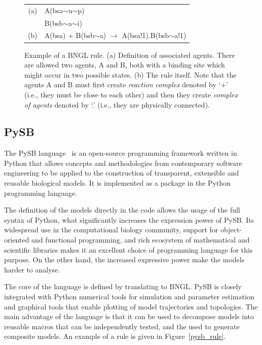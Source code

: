\documentclass[11pt,a4paper]{report}
\begin{document}
\begin{figure}[!h]
\begin{center}
\begin{tabular}{c l}
(a) & A(bsa$\sim$u$\sim$p) \\
  & B(bsb$\sim$a$\sim$i) \\
(b) & A(bsa) + B(bsb$\sim$a) $\rightarrow$ A(bsa!1).B(bsb$\sim$a!1) \\
\end{tabular}
\end{center}
\caption{Example of a BNGL rule. (a) Definition of associated agents. There are allowed two agents, A and B, both with a binding site which might occur in two possible states. (b) The rule itself. Note that the agents A and B must first create \emph{reaction complex} denoted by `+' (i.e., they must be close to each other) and then they create \emph{complex of agents} denoted by `.' (i.e., they are physically connected).}\label{bngl-rule}
\end{figure}

\subsection{PySB}

The PySB language~\cite{Lopez646} is an open-source programming framework written in Python that allows concepts and methodologies from contemporary software engineering to be applied to the construction of transparent, extensible and reusable biological  models. It is implemented as a package in the Python programming language. 

The definition of the models directly in the code allows the usage of the full syntax of Python, what significantly increases the expression power of PySB. Its widespread use in the computational biology community, support for object-oriented and functional programming, and rich ecosystem of mathematical and scientific libraries makes it an excellent choice of programming language for this purpose. On the other hand, the increased expressive power make the models harder to analyse.

The core of the language is defined by translating to BNGL. PySB is closely integrated with Python numerical tools for simulation and parameter estimation and graphical tools that enable plotting of model trajectories and topologies. The main advantage of the language is that it can be used to decompose models into reusable macros that can be independently tested, and the used to generate composite models. An example of a rule is given in Figure~\ref{pysb_rule}.
\end{document}
